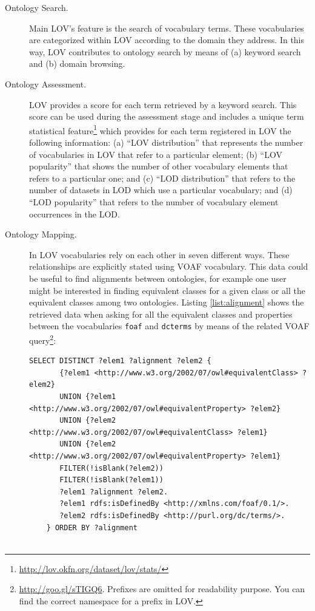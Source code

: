 \begin{description}

 \item [Ontology Search.] Main LOV's feature is the search of vocabulary terms. These vocabularies are categorized within LOV according to the domain they address. In this way, LOV contributes to ontology search by means of (a) keyword search and (b) domain browsing.
 \item [Ontology Assessment.] LOV provides a score for each term retrieved by a keyword search. This score can be used during the assessment stage and includes a unique term statistical feature\footnote{\url{http://lov.okfn.org/dataset/lov/stats/}} which provides for each term registered in LOV the following information: (a) ``LOV distribution'' that represents the number of vocabularies in LOV that refer to a particular element; (b) ``LOV popularity'' that shows the number of other vocabulary elements that refers to a particular one; and (c) ``LOD distribution'' that refers to the number of datasets in LOD which use a particular vocabulary; and (d) ``LOD popularity'' that refers to the number of vocabulary element occurrences in the LOD.
 \item [Ontology Mapping.] In LOV vocabularies rely on each other in seven different ways. These relationships are explicitly stated using VOAF vocabulary. This data could be useful to find alignments between ontologies, for example one user might be interested in finding equivalent classes for a given class or all the equivalent classes among two ontologies. Listing \ref{list:alignment} shows the retrieved data when asking for all the equivalent classes and properties between the vocabularies \texttt{foaf} and \texttt{dcterms} by means of the related VOAF query\footnote{\url{http://goo.gl/sTIGQ6}. Prefixes are omitted for readability purpose. You can find the correct namespace for a prefix in LOV.}:

\begin{lstlisting}[float=htb,caption={SPARQL query asking for all the equivalent classes and properties between the vocabularies foaf and dcterms. },label=list:alignment]
    SELECT DISTINCT ?elem1 ?alignment ?elem2 {
	   {?elem1 <http://www.w3.org/2002/07/owl#equivalentClass> ?elem2}
	   UNION {?elem1 <http://www.w3.org/2002/07/owl#equivalentProperty> ?elem2}
	   UNION {?elem2 <http://www.w3.org/2002/07/owl#equivalentClass> ?elem1}
	   UNION {?elem2 <http://www.w3.org/2002/07/owl#equivalentProperty> ?elem1}
	   FILTER(!isBlank(?elem2))
	   FILTER(!isBlank(?elem1))
	   ?elem1 ?alignment ?elem2.
	   ?elem1 rdfs:isDefinedBy <http://xmlns.com/foaf/0.1/>.
	   ?elem2 rdfs:isDefinedBy <http://purl.org/dc/terms/>.
	} ORDER BY ?alignment
	

\end{lstlisting}
\end{description}

